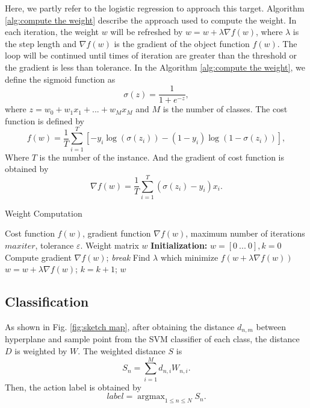 \documentclass[conference]{IEEEtran}
\begin{document}
		Here, we partly refer to the logistic regression to approach this target.
		Algorithm \ref{alg:compute the weight} describe the approach used to compute the weight.
		In each iteration, the weight $ w $ will be refreshed by $ w = w + \lambda\nabla f(w) $, where $ \lambda $ is the step length and $ \nabla f(w) $ is the gradient of the object function $ f(w) $.
		The loop will be continued until times of iteration are greater than the threshold or the gradient is less than tolerance.
		In the Algorithm \ref{alg:compute the weight}, we define the sigmoid function as
		\begin{equation}
			\sigma(z) = \frac{1}{1+e^{-z}},
		\end{equation}
		where $ z = w_{0} + w_{1}x_{1} + ... + w_{M}x_{M} $ and $ M $ is the number of classes.
		The cost function is defined by
		\begin{equation}
			f(w) = \frac{1}{T}\sum_{i=1}^{T}[-y_{i}\log(\sigma(z_{i})) - (1-y_{i})\log(1-\sigma(z_{i}))],
		\end{equation}
		Where $ T $ is the number of the instance.
		And the gradient of cost function is obtained by
		\begin{equation}
			\nabla f(w) = \frac{1}{T}\sum_{i=1}^{T}(\sigma(z_{i}) - y_{i})x_{i}.
		\end{equation}
		\begin{algorithm}
			\caption{Weight Computation}
			\label{alg:compute the weight}
			\begin{algorithmic}
				\REQUIRE Cost function $ f(w) $, gradient function $ \nabla f(w) $, maximum number of iterations $ maxiter $, tolerance $ \varepsilon $.
				\ENSURE Weight matrix $ w $
				\STATE\textbf{Initialization:} $ w = [0~...~0], k = 0 $
				\STATE Compute gradient $ \nabla f(w) $;
					\STATE \textit{break}
				\ENDIF
				\STATE Find $ \lambda $ which minimize $ f(w + \lambda\nabla f(w)) $
				\STATE $ w = w + \lambda\nabla f(w) $;
				\STATE $ k = k + 1 $;
				\ENDWHILE
				\RETURN $ w $
			\end{algorithmic}
		\end{algorithm}
			
	\subsection{Classification}
		As shown in Fig. \ref{fig:sketch map}, after obtaining the distance $ d_{n,m} $ between hyperplane and sample point from the SVM classifier of each class, the distance $ D $ is weighted by $ W $. The weighted distance $ S $ is
		\begin{equation}
			S_{n}=\sum_{i=1}^{M}d_{n,i}W_{n,i}.
		\end{equation}
		Then, the action label is obtained by
		\begin{equation}
			label=\mathop{\arg\max}_{1\leq n\leq N}{S_{n}}.
		\end{equation}
\end{document}
